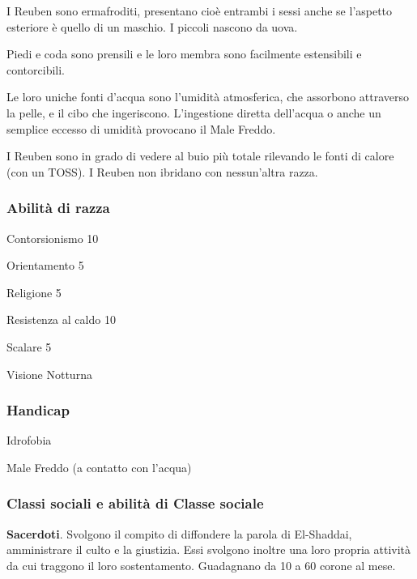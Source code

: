 I Reuben sono ermafroditi, presentano cio\`e entrambi i sessi anche
se l'aspetto esteriore \`e quello di un maschio. I piccoli nascono
da uova. 

Piedi e coda sono prensili e le loro membra sono facilmente
estensibili e contorcibili. 

Le loro uniche fonti d'acqua sono l'umidit\`a atmosferica, che
assorbono attraverso la pelle, e il cibo che ingeriscono.
L'ingestione diretta dell'acqua o anche un semplice eccesso di
umidit\`a provocano il Male Freddo.

I Reuben sono in grado di vedere al buio pi\`u totale rilevando le
fonti di calore (con un TOSS). I Reuben non ibridano con nessun'altra
razza.

\minmaxreuben

\subsubsection{Abilit\`a di razza}

\begin{abilist}
\item Contorsionismo 10
\item Orientamento 5
\item Religione 5
\item Resistenza al caldo 10
\item Scalare 5
\item Visione Notturna
\end{abilist}

\subsubsection{Handicap}

\begin{abilist}
\item Idrofobia
\item Male Freddo (a contatto con l'acqua)
\end{abilist}

\subsubsection{Classi sociali e abilit\`a di Classe sociale}


\textbf{Sacerdoti}. Svolgono il compito di diffondere la parola di
El-Shaddai, amministrare il culto e la giustizia. Essi svolgono
inoltre una loro propria attivit\`a da cui traggono il loro
sostentamento. Guadagnano da 10 a 60 corone al mese.

